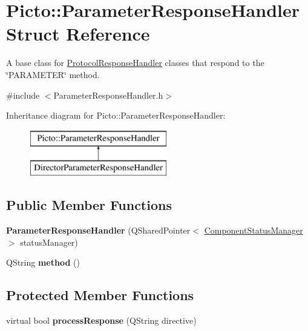 \hypertarget{struct_picto_1_1_parameter_response_handler}{\section{Picto\-:\-:Parameter\-Response\-Handler Struct Reference}
\label{struct_picto_1_1_parameter_response_handler}
}


A base class for \hyperlink{struct_picto_1_1_protocol_response_handler}{Protocol\-Response\-Handler} classes that respond to the \char`\"{}\-P\-A\-R\-A\-M\-E\-T\-E\-R\char`\"{} method.  




{\ttfamily \#include $<$Parameter\-Response\-Handler.\-h$>$}

Inheritance diagram for Picto\-:\-:Parameter\-Response\-Handler\-:\begin{figure}[H]
\begin{center}
\leavevmode
\includegraphics[height=2.000000cm]{struct_picto_1_1_parameter_response_handler}
\end{center}
\end{figure}
\subsection*{Public Member Functions}
\begin{DoxyCompactItemize}
\item 
\hypertarget{struct_picto_1_1_parameter_response_handler_ab604bc1b3cf7697fd99c80cf5011ee31}{{\bfseries Parameter\-Response\-Handler} (Q\-Shared\-Pointer$<$ \hyperlink{class_component_status_manager}{Component\-Status\-Manager} $>$ status\-Manager)}\label{struct_picto_1_1_parameter_response_handler_ab604bc1b3cf7697fd99c80cf5011ee31}

\item 
\hypertarget{struct_picto_1_1_parameter_response_handler_a55afc35f53a3ec232ba96a651dc7d983}{Q\-String {\bfseries method} ()}\label{struct_picto_1_1_parameter_response_handler_a55afc35f53a3ec232ba96a651dc7d983}

\end{DoxyCompactItemize}
\subsection*{Protected Member Functions}
\begin{DoxyCompactItemize}
\item 
\hypertarget{struct_picto_1_1_parameter_response_handler_af1610db2e55ecf7576b96fbd5144bd81}{virtual bool {\bfseries process\-Response} (Q\-String directive)}\label{struct_picto_1_1_parameter_response_handler_af1610db2e55ecf7576b96fbd5144bd81}

\end{DoxyCompactItemize}


